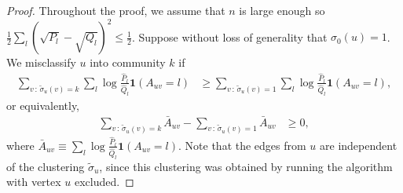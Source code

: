 \documentclass{article}
\begin{document}
\begin{proof}
Throughout the proof, we assume that $n$ is large enough so $\frac{1}{2} \sum_l (\sqrt{P_l} - \sqrt{Q_l})^2 \leq \frac{1}{2}$. Suppose without loss of generality that $\sigma_0(u) = 1$.  We misclassify $u$ into community $k$ if 
\begin{align*}
\sum_{v\,:\, \tilde \sigma_u(v)=k} \sum_l \log \frac{\hat{P}_l}{\hat{Q}_l} \mathbf{1}(A_{uv} = l) 
&\geq 
 \sum_{v\,:\, \tilde \sigma_u(v)=1} \sum_l \log \frac{\hat{P}_l}{\hat{Q}_l} \mathbf{1}(A_{uv} = l),
\end{align*}
or equivalently,
\begin{align}
\sum_{v \,:\, \tilde \sigma_u(v) = k} \bar{A}_{uv} - \sum_{v\,:\, \tilde \sigma_u(v) = 1} \bar{A}_{uv}
\label{eqn:bad_event1}
&\geq 0, 
\end{align}
where $\bar{A}_{uv} \equiv \sum_l \log \frac{\hat{P}_l}{\hat{Q}_l} \mathbf{1}(A_{uv} = l)$. Note that the edges from $u$ are independent of the clustering $\tilde \sigma_u$, since this clustering was obtained by running the algorithm with vertex $u$ excluded. 


\end{proof}
\end{document}
